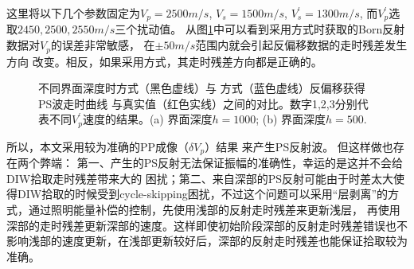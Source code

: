 这里将以下几个参数固定为$V_p=2500m/s$, $V_s=1500m/s$, $V^{'}_s=1300m/s$, 而$V^{'}_p$选取$2450,
2500, 2550m/s$三个扰动值。
从图\ref{fig:Sens_vp}中可以看到采用方式\uppercase\expandafter{}时获取的Born反射数据对$V_p$的误差非常敏感，
在$\pm50m/s$范围内就会引起反偏移数据的走时残差发生方向
改变。相反，如果采用方式\uppercase\expandafter{}，其走时残差方向都是正确的。
\begin{figure}[h]
   \centering
   \caption{不同界面深度时方式\uppercase\expandafter{}（黑色虚线）与
   方式\uppercase\expandafter{}（蓝色虚线）反偏移获得PS波走时曲线
   与真实值（红色实线）之间的对比。数字1,2,3分别代表不同$V^{'}_p$速度的结果。(a) 界面深度$h=1000$; (b) 界面深度$h=500$.}
   \label{fig:Sens_vp}
\end{figure}

所以，本文采用较为准确的PP成像（$\delta V_p$）结果
来产生PS反射波。
但这样做也存在两个弊端：
第一、产生的PS反射无法保证振幅的准确性，幸运的是这并不会给DIW拾取走时残差带来大的
困扰；第二、来自深部的PS反射可能由于时差太大使得DIW拾取的时候受到cycle-skipping困扰，不过这个问题可以采用“层剥离”的方式，通过照明能量补偿的控制，先使用浅部的反射走时残差来更新浅层，
再使用深部的走时残差更新深部的速度。这样即使初始阶段深部的反射走时残差错误也不影响浅部的速度更新，在浅部更新较好后，深部的反射走时残差也能保证拾取较为准确。

